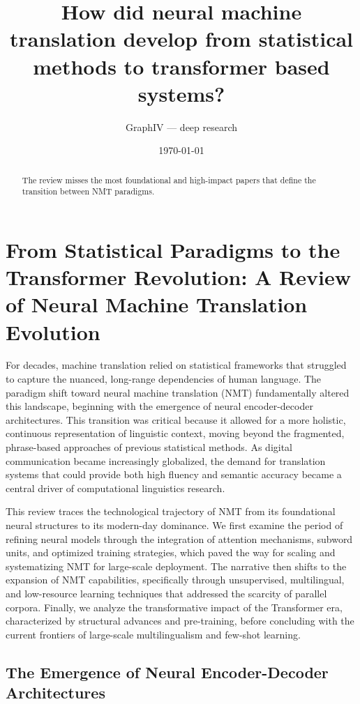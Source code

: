 \documentclass[11pt]{article}
\title{How did neural machine translation develop from statistical methods to transformer based systems?}
\author{GraphIV --- deep research}
\date{\today}
\begin{document}
\maketitle

\begin{abstract}
The review misses the most foundational and high-impact papers that define the transition between NMT paradigms.
\end{abstract}

\section{From Statistical Paradigms to the Transformer Revolution: A Review of Neural Machine Translation Evolution}

For decades, machine translation relied on statistical frameworks that struggled to capture the nuanced, long-range dependencies of human language. The paradigm shift toward neural machine translation (NMT) fundamentally altered this landscape, beginning with the emergence of neural encoder-decoder architectures. This transition was critical because it allowed for a more holistic, continuous representation of linguistic context, moving beyond the fragmented, phrase-based approaches of previous statistical methods. As digital communication became increasingly globalized, the demand for translation systems that could provide both high fluency and semantic accuracy became a central driver of computational linguistics research.

This review traces the technological trajectory of NMT from its foundational neural structures to its modern-day dominance. We first examine the period of refining neural models through the integration of attention mechanisms, subword units, and optimized training strategies, which paved the way for scaling and systematizing NMT for large-scale deployment. The narrative then shifts to the expansion of NMT capabilities, specifically through unsupervised, multilingual, and low-resource learning techniques that addressed the scarcity of parallel corpora. Finally, we analyze the transformative impact of the Transformer era, characterized by structural advances and pre-training, before concluding with the current frontiers of large-scale multilingualism and few-shot learning.

\subsection{The Emergence of Neural Encoder-Decoder Architectures}
\end{document}
